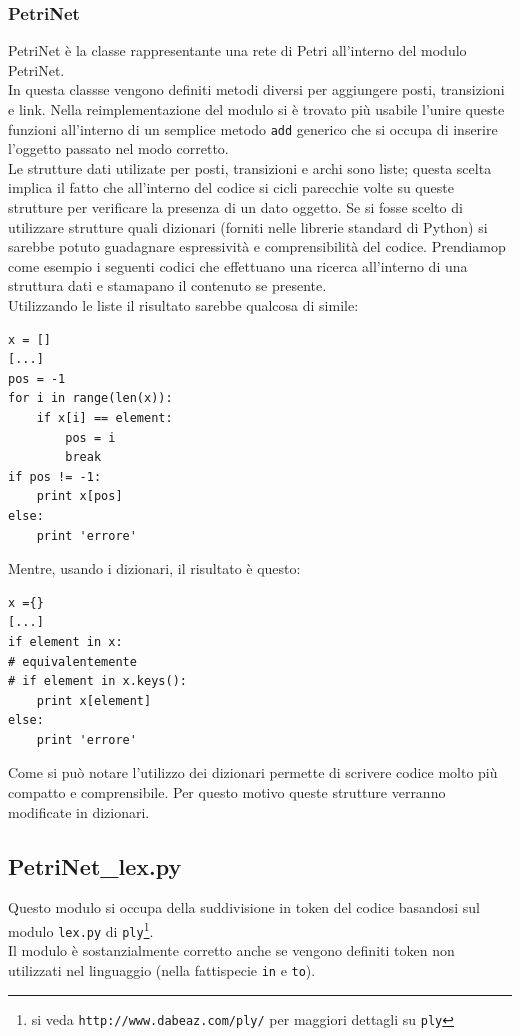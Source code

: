 \documentclass[italian,12pt]{book}
\begin{document}
\subsubsection{PetriNet}
PetriNet è la classe rappresentante una rete di Petri all'interno del modulo PetriNet. \\
In questa classse vengono definiti metodi diversi per aggiungere posti, transizioni e link. Nella 
reimplementazione del modulo si è trovato più usabile l'unire queste funzioni all'interno di un semplice
metodo {\tt add} generico che si occupa di inserire l'oggetto passato nel modo corretto.\\
Le strutture dati utilizate per posti, transizioni e archi sono liste; questa scelta implica il fatto
che all'interno del codice si cicli parecchie volte su queste strutture per verificare la presenza 
di un dato oggetto. Se si fosse scelto di utilizzare strutture quali dizionari (forniti nelle librerie 
standard di Python) si sarebbe potuto guadagnare espressività e comprensibilità del codice.
Prendiamop come esempio i seguenti codici che effettuano una ricerca all'interno di una struttura 
dati e stamapano il contenuto se presente.\\
Utilizzando le liste il risultato sarebbe qualcosa di simile:
\begin{verbatim}x = []
[...]
pos = -1
for i in range(len(x)):
    if x[i] == element:
        pos = i
        break
if pos != -1:
    print x[pos] 
else:
    print 'errore'
\end{verbatim}
Mentre, usando i dizionari, il risultato è questo:
\begin{verbatim}x ={}
[...]
if element in x:
# equivalentemente 
# if element in x.keys():
    print x[element]
else:
    print 'errore'
\end{verbatim}
Come si può notare l'utilizzo dei dizionari permette di scrivere codice molto più compatto e comprensibile.
Per questo motivo queste strutture verranno modificate in dizionari.

\subsection{PetriNet\_lex.py}
Questo modulo si occupa della suddivisione in token del codice basandosi sul modulo {\tt lex.py} di
{\tt ply}\footnote{si veda {\tt http://www.dabeaz.com/ply/} per maggiori dettagli su {\tt ply}}. \\
Il modulo è sostanzialmente corretto anche se vengono definiti token non utilizzati nel linguaggio 
(nella fattispecie {\tt in} e {\tt to}).
\end{document}
